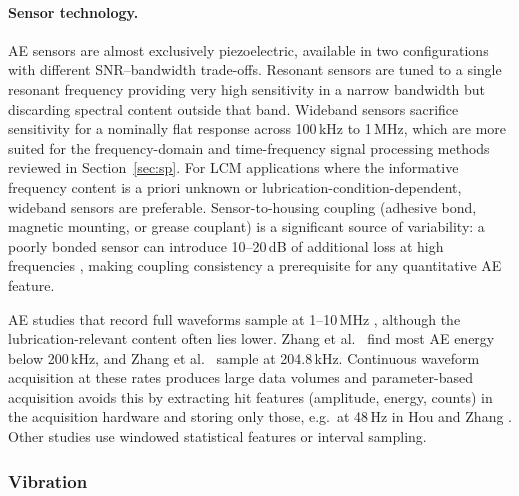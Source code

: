 \paragraph{Sensor technology.}
AE sensors are almost exclusively piezoelectric, available in two configurations with different SNR--bandwidth trade-offs. Resonant sensors are tuned to a single resonant frequency providing very high sensitivity in a narrow bandwidth but discarding spectral content outside that band. Wideband sensors sacrifice sensitivity for a nominally flat response across 100\,kHz to 1\,MHz, which are more suited for the frequency-domain and time-frequency signal processing methods reviewed in Section~\ref{sec:sp}. For LCM applications where the informative frequency content is a priori unknown or lubrication-condition-dependent, wideband sensors are preferable. Sensor-to-housing coupling (adhesive bond, magnetic mounting, or grease couplant) is a significant source of variability: a poorly bonded sensor can introduce 10--20\,dB of additional loss at high frequencies \cite{scheeren_evaluation_2022}, making coupling consistency a prerequisite for any quantitative AE feature.

AE studies that record full waveforms sample at 1--10\,MHz \cite{zhang_coupled_2026,usgame_sandoval_acoustic_2013,scheeren_acoustic_2024,zhang_health_2025}, although the lubrication-relevant content often lies lower. Zhang et al.\ \cite{zhang_coupled_2026} find most AE energy below 200\,kHz, and Zhang et al.\ \cite{zhang_graph-data-based_2024} sample at 204.8\,kHz. Continuous waveform acquisition at these rates produces large data volumes and parameter-based acquisition avoids this by extracting hit features (amplitude, energy, counts) in the acquisition hardware and storing only those, e.g.\ at 48\,Hz in Hou and Zhang \cite{hou_-situ_2025}. Other studies use windowed statistical features or interval sampling.

\subsubsection{Vibration}
\label{subsubsec:vibration}

